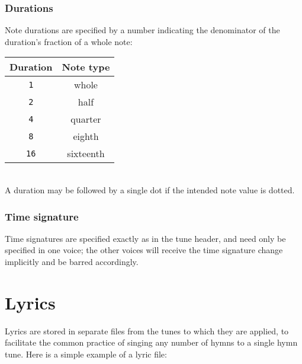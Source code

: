 \documentclass{article}
\begin{document}
\subsubsection*{Durations}

Note durations are specified by a number indicating the denominator of
the duration's fraction of a whole note:\\

\begin{tabular}{| c | c |}

  \hline
  \textbf{Duration} & \textbf{Note type}\\
  \hline
  \texttt{1} & whole\\
  \texttt{2} & half\\
  \texttt{4} & quarter\\
  \texttt{8} & eighth\\
  \texttt{16} & sixteenth\\
  \hline

\end{tabular}\\

\noindent
A duration may be followed by a single dot if the intended note value
is dotted.

\subsubsection*{Time signature}

Time signatures are specified exactly as in the tune header, and need
only be specified in one voice; the other voices will receive the time
signature change implicitly and be barred accordingly.

\section{Lyrics}

Lyrics are stored in separate files from the tunes to which they are
applied, to facilitate the common practice of singing any number of
hymns to a single hymn tune.  Here is a simple example of a lyric
file:
\end{document}
